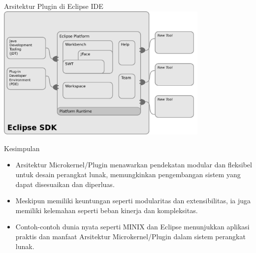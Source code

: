 \documentclass[aspectratio=169, table]{beamer}
\begin{document}
    \begin{frame}{Arsitektur Plugin di Eclipse IDE}
        \vspace{10pt}
        \centering
        \includegraphics[width=0.78\textwidth]{../../images/plugin1}
    \end{frame}

    \begin{frame}{Kesimpulan}
        \begin{itemize}
            \item Arsitektur Microkernel/Plugin menawarkan pendekatan modular dan fleksibel untuk desain perangkat lunak, memungkinkan pengembangan sistem yang dapat disesuaikan dan diperluas.
            \item Meskipun memiliki keuntungan seperti modularitas dan extensibilitas, ia juga memiliki kelemahan seperti beban kinerja dan kompleksitas.
            \item Contoh-contoh dunia nyata seperti MINIX dan Eclipse menunjukkan aplikasi praktis dan manfaat Arsitektur Microkernel/Plugin dalam sistem perangkat lunak.
        \end{itemize}
    \end{frame}
\end{document}

